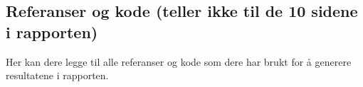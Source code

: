 \subsection{Referanser og kode (teller ikke til de 10 sidene i rapporten)}\label{referanser-og-kode-teller-ikke-til-de-10-sidene-i-rapporten}

Her kan dere legge til alle referanser og kode som dere har brukt for å
generere resultatene i rapporten.
